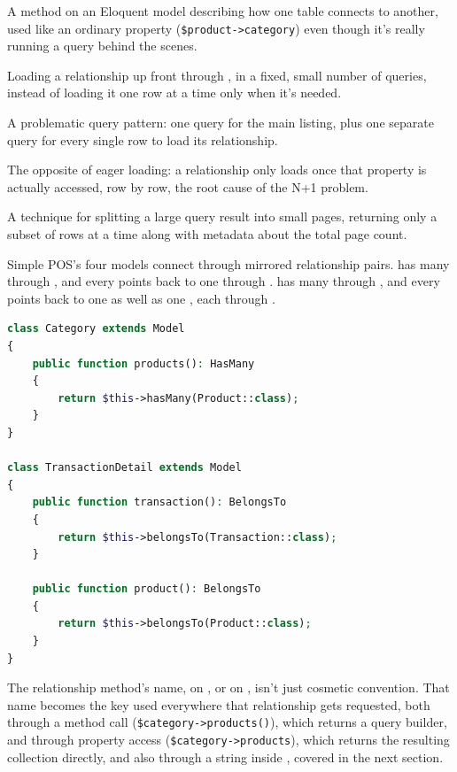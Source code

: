 \begin{istilahpenting}
\begin{description}[leftmargin=0pt,style=nextline]
  \item[Relationship] A method on an Eloquent model describing how one table connects to another, used like an ordinary property (\texttt{\$product->category}) even though it's really running a query behind the scenes.
  \item[Eager Loading] Loading a relationship up front through , in a fixed, small number of queries, instead of loading it one row at a time only when it's needed.
  \item[N+1] A problematic query pattern: one query for the main listing, plus one separate query for every single row to load its relationship.
  \item[Lazy Loading] The opposite of eager loading: a relationship only loads once that property is actually accessed, row by row, the root cause of the N+1 problem.
  \item[Pagination] A technique for splitting a large query result into small pages, returning only a subset of rows at a time along with metadata about the total page count.
\end{description}
\end{istilahpenting}

Simple POS's four models connect through mirrored relationship pairs.
 has many  through
, and every  points back to one
 through . 
has many  through , and
every  points back to one
 as well as one , each through
.

\begin{lstlisting}[language=php]
class Category extends Model
{
    public function products(): HasMany
    {
        return $this->hasMany(Product::class);
    }
}

class TransactionDetail extends Model
{
    public function transaction(): BelongsTo
    {
        return $this->belongsTo(Transaction::class);
    }

    public function product(): BelongsTo
    {
        return $this->belongsTo(Product::class);
    }
}
\end{lstlisting}

The relationship method's name,  on
, or  on
, isn't just cosmetic convention. That name
becomes the key used everywhere that relationship gets requested, both
through a method call (\texttt{\$category->products()}), which returns
a query builder, and through property access
(\texttt{\$category->products}), which returns the resulting collection
directly, and also through a string inside
, covered in the next section.

